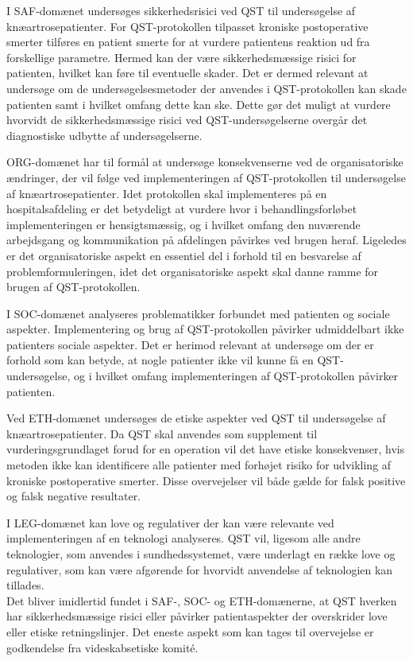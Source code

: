 I SAF-domænet undersøges sikkerhedsrisici ved QST til undersøgelse af knæartrosepatienter. For QST-protokollen tilpasset kroniske postoperative smerter tilføres en patient smerte for at vurdere patientens reaktion ud fra forskellige parametre. Hermed kan der være sikkerhedsmæssige risici for patienten, hvilket kan føre til eventuelle skader. Det er dermed relevant at undersøge om de undersøgelsesmetoder der anvendes i QST-protokollen kan skade patienten samt i hvilket omfang dette kan ske. Dette gør det muligt at vurdere hvorvidt de sikkerhedsmæssige risici ved QST-undersøgelserne overgår det diagnostiske udbytte af undersøgelserne. 

ORG-domænet har til formål at undersøge konsekvenserne ved de organisatoriske ændringer, der vil følge ved implementeringen af QST-protokollen til undersøgelse af knæartrosepatienter. Idet protokollen skal implementeres på en hospitalsafdeling er det betydeligt at vurdere hvor i behandlingsforløbet implementeringen er hensigtsmæssig, og i hvilket omfang den nuværende arbejdsgang og kommunikation på afdelingen påvirkes ved brugen heraf. Ligeledes er det organisatoriske aspekt en essentiel del i forhold til en besvarelse af problemformuleringen, idet det organisatoriske aspekt skal danne ramme for brugen af QST-protokollen.

I SOC-domænet analyseres problematikker forbundet med patienten og sociale aspekter. Implementering og brug af QST-protokollen påvirker udmiddelbart ikke patienters sociale aspekter. Det er herimod relevant at undersøge om  der er forhold som kan betyde, at nogle patienter ikke vil kunne få en QST-undersøgelse, og i hvilket omfang implementeringen af QST-protokollen påvirker patienten.

Ved ETH-domænet undersøges de etiske aspekter ved QST til undersøgelse af knæartrosepatienter. Da QST skal anvendes som supplement til vurderingsgrundlaget forud for en operation vil det have etiske konsekvenser, hvis metoden ikke kan identificere alle patienter med forhøjet risiko for udvikling af kroniske postoperative smerter. Disse overvejelser vil både gælde for falsk positive og falsk negative resultater. 

I LEG-domænet kan love og regulativer der kan være relevante ved implementeringen af en teknologi analyseres. QST vil, ligesom alle andre teknologier, som anvendes i sundhedssystemet, være underlagt en række love og regulativer, som kan være afgørende for hvorvidt anvendelse af teknologien kan tillades.\\ 
Det bliver imidlertid fundet i SAF-, SOC- og ETH-domænerne, at QST hverken har sikkerhedsmæssige risici eller påvirker patientaspekter der overskrider love eller etiske retningslinjer. Det eneste aspekt som kan tages til overvejelse er godkendelse fra videskabsetiske komité. 


